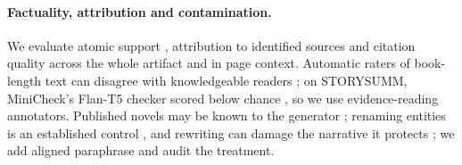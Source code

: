 \paragraph{Factuality, attribution and contamination.}
We evaluate atomic support \citep{min2023factscore}, attribution to identified sources
\citep{rashkin2021ais} and citation quality \citep{gao2023alce} across the whole artifact and
in page context. Automatic raters of book-length text can disagree with knowledgeable readers
\citep{kim2024fables}; on STORYSUMM, MiniCheck's Flan-T5 checker \citep{tang2024minicheck}
scored below chance \citep{subbiah2024storysumm}, so we use evidence-reading annotators.
Published novels may be known to the generator \citep{chang2023speak,cheng2025contamination};
renaming entities is an established control \citep{gupta2025whodunit,zhang2024infinitebench},
and rewriting can damage the narrative it protects \citep{sun2025emperor}; we add aligned
paraphrase and audit the treatment.
